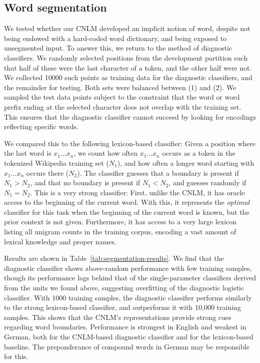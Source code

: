 \subsection{Word segmentation}
\label{sec:segmentation}


We tested whether our CNLM developed an implicit notion of word, despite not being endowed with a hard-coded word dictionary, and being exposed to unsegmented input. %
To answer this, we return to the method of diagnostic classifiers.
We randomly selected positions from the development partition such that half of these were the last character of a token, and the other half were not.
We collected 10000 such points as training data for the diagnostic classifiers, and the remainder for testing.
Both sets were balanced between (1) and (2).
We sampled the test data points subject to the constraint that the word or word prefix ending at the selected character does not overlap with the training set.
This ensures that the diagnostic classifier cannot succeed by looking for encodings reflecting specific words.



We compared this to the following lexicon-based classifier:
Given a position where the last word is $x_1...x_n$, we count how often $x_1...x_n$ occurs as a token in the tokenized Wikipedia training set ($N_1$), and how often a longer word starting with $x_1...x_n$ occurs there ($N_2$).
The classifier guesses that a boundary is present if $N_1 > N_2$, and that no boundary is present if $N_1 < N_2$, and guesses randomly if $N_1 = N_2$.
This is a very strong classifier:
First, unlike the CNLM, it has oracle access to the beginning of the current word.
With this, it represents the \emph{optimal} classifier for this task when the beginning of the current word is known, but the prior context is not given.
Furthermore, it has access to a very large lexicon listing all unigram counts in the training corpus, encoding a vast amount of lexical knowledge and proper names.

Results are shown in Table~\ref{tab:segmentation-results}.
We find that the diagnostic classifier shows above-random performance with few training samples, though its performance lags behind that of the single-parameter classifiers derived from the units we found above, suggesting overfitting of the diagnostic logistic classifier.
With 1000 training samples, the diagnostic classifier performs similarly to the strong lexicon-based classifier, and outperforms it with 10,000 training samples.
This shows that the CNLM's representations provide strong cues regarding word boundaries.
Performance is strongest in English and weakest in German, both for the CNLM-based diagnostic classifier and for the lexicon-based baseline.
The preponderance of compound words in German may be responsible for this.




